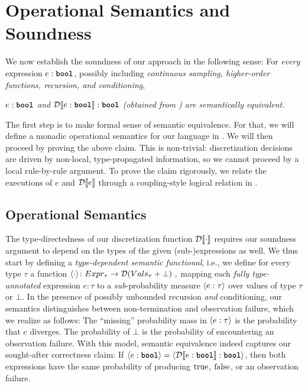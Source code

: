 \section{Operational Semantics and Soundness}
\label{sec:soundness}%
%
We now establish the soundness of our approach in the following sense: For \emph{every} expression $e:\textnormal{\ttfamily\bfseries bool}$, possibly including \emph{continuous sampling, higher-order functions, recursion, and conditioning},
%
\begin{center}
	\emph{$e: \textnormal{\ttfamily\bfseries bool}$ and $\mathcal{D}\llbracket e : \textnormal{\ttfamily\bfseries bool} \rrbracket:\textnormal{\ttfamily\bfseries bool}$ (obtained from ) are semantically equivalent.}
\end{center}
%
The first step is to make formal sense of semantic equivalence. For that, we will define a monadic operational semantics for our language in . We will then proceed by proving the above claim. This is non-trivial: discretization decisions are driven by non-local, type-propagated information, so we cannot proceed by a local rule-by-rule argument. To prove the claim rigorously, we relate the executions of $e$ and $\mathcal{D}\llbracket e \rrbracket$ through a coupling-style logical relation in . %
%
\subsection{Operational Semantics}
\label{sec:opsem}
%
The type-directedness of our discretization function $\mathcal{D}\llbracket \cdot \rrbracket$ requires our soundness argument to depend on the types of the given (sub-)expressions as well. We thus start by defining a \emph{type-dependent semantic functional}, i.e., we define for every type $\tau$ a function 
%
$
	\langle \cdot \rangle\colon Expr_\tau \to \mathcal{D}(Vals_\tau + \bot)~,
$
%
mapping each \emph{fully type-annotated} expression $e:\tau$ to a  \emph{sub}-probability measure $\langle e : \tau \rangle$ over values of type $\tau$ or $\bot$. In the presence of possibly unbounded recursion \emph{and} conditioning, our semantics distinguishes between non-termination and observation failure, which we realize as follows: The \enquote{missing} probability mass in $\langle e : \tau \rangle$ is the probability that $e$ diverges. The probability of $\bot$ is the probability of encountering an observation failure. With this model, semantic equivalence indeed captures our sought-after correctness claim: If $\langle e:\textnormal{\ttfamily\bfseries bool} \rangle = \langle \mathcal{D}\llbracket e:\textnormal{\ttfamily\bfseries bool} \rrbracket:\textnormal{\ttfamily\bfseries bool} \rangle$, then both expressions have the same probability of producing $\textnormal{true}$, $\textnormal{false}$, or an observation failure.

